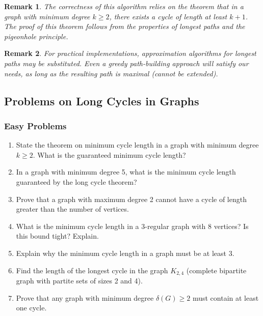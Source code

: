 \documentclass{article}
\newtheorem{remark}{Remark}
\theoremstyle{definition}
\begin{document}
\begin{remark}
The correctness of this algorithm relies on the theorem that in a graph with minimum degree $k \geq 2$, there exists a cycle of length at least $k+1$. The proof of this theorem follows from the properties of longest paths and the pigeonhole principle.
\end{remark}

\begin{remark}
For practical implementations, approximation algorithms for longest paths may be substituted. Even a greedy path-building approach will satisfy our needs, as long as the resulting path is maximal (cannot be extended).
\end{remark}

\subsection{Problems on Long Cycles in Graphs}

\subsubsection{Easy Problems}
\begin{enumerate}
\item State the theorem on minimum cycle length in a graph with minimum degree $k \geq 2$. What is the guaranteed minimum cycle length?

\item In a graph with minimum degree 5, what is the minimum cycle length guaranteed by the long cycle theorem?

\item Prove that a graph with maximum degree 2 cannot have a cycle of length greater than the number of vertices.

\item What is the minimum cycle length in a 3-regular graph with 8 vertices? Is this bound tight? Explain.

\item Explain why the minimum cycle length in a graph must be at least 3.

\item Find the length of the longest cycle in the graph $K_{2,4}$ (complete bipartite graph with partite sets of sizes 2 and 4).

\item Prove that any graph with minimum degree $\delta(G) \geq 2$ must contain at least one cycle.
\end{enumerate}
\end{document}
